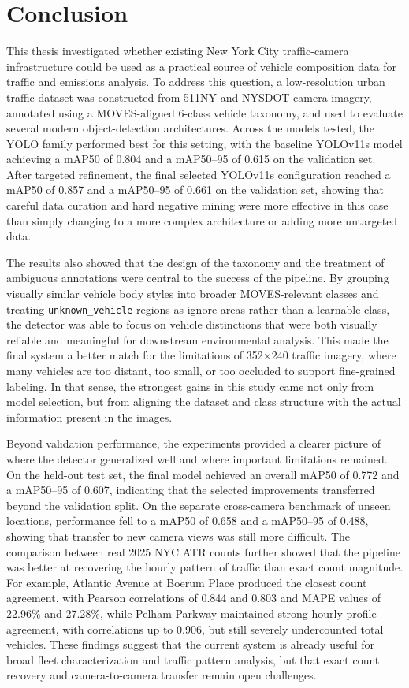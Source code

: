\newpage
\section{Conclusion}

This thesis investigated whether existing New York City traffic-camera infrastructure 
could be used as a practical source of vehicle composition data for traffic and 
emissions analysis. To address this question, a low-resolution urban traffic dataset 
was constructed from 511NY and NYSDOT camera imagery, annotated using a MOVES-aligned 
6-class vehicle taxonomy, and used to evaluate several modern object-detection 
architectures. Across the models tested, the YOLO family performed best for this 
setting, with the baseline YOLOv11s model achieving a mAP50 of 0.804 and a mAP50--95 of 
0.615 on the validation set. After targeted refinement, the final selected YOLOv11s 
configuration reached a mAP50 of 0.857 and a mAP50--95 of 0.661 on the validation set, showing that careful 
data curation and hard negative mining were more effective in this case than simply 
changing to a more complex architecture or adding more untargeted data.

The results also showed that the design of the taxonomy and the treatment of ambiguous 
annotations were central to the success of the pipeline. By grouping visually similar 
vehicle body styles into broader MOVES-relevant classes and treating 
\verb|unknown_vehicle| regions as ignore areas rather than a learnable class, the 
detector was able to focus on vehicle distinctions that were both visually reliable 
and meaningful for downstream environmental analysis. This made the final system a 
better match for the limitations of 352$\times$240 traffic imagery, where many vehicles 
are too distant, too small, or too occluded to support fine-grained labeling. In 
that sense, the strongest gains in this study came not only from model selection, 
but from aligning the dataset and class structure with the actual information present 
in the images.

Beyond validation performance, the experiments provided a clearer picture of where 
the detector generalized well and where important limitations remained. On the 
held-out test set, the final model achieved an overall mAP50 of 0.772 and a mAP50--95 of 
0.607, indicating that the selected improvements transferred beyond the validation 
split. On the separate cross-camera benchmark of unseen locations, performance fell 
to a mAP50 of 0.658 and a mAP50--95 of 0.488, showing that transfer to new camera views 
was still more difficult. The comparison between real 2025 NYC ATR counts further 
showed that the pipeline was better at recovering the hourly pattern of traffic than exact count magnitude. 
For example, Atlantic Avenue at Boerum Place produced the closest count agreement, with 
Pearson correlations of 0.844 and 0.803 and MAPE values of 22.96\% and 27.28\%, 
while Pelham Parkway maintained strong hourly-profile agreement, with correlations 
up to 0.906, but still severely undercounted total vehicles. These findings suggest 
that the current system is already useful for broad fleet characterization and traffic 
pattern analysis, but that exact count recovery and camera-to-camera transfer remain 
open challenges.

